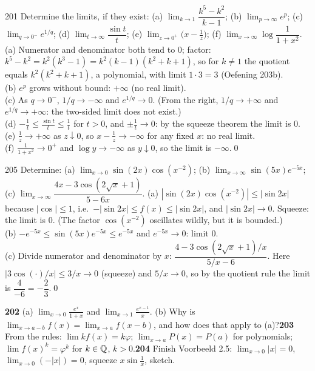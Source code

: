\begin{bookex}{201}
Determine the limits, if they exist: (a) $\lim_{k\to1}\dfrac{k^5-k^2}{k-1}$; (b) $\lim_{p\to\infty}e^p$; (c) $\lim_{q\to0^-}e^{1/q}$; (d) $\lim_{t\to\infty}\dfrac{\sin t}t$; (e) $\lim_{z\to0^+}\big(x-\frac1z\big)$; (f) $\lim_{x\to\infty}\log\dfrac1{1+x^2}$.
\solution
(a) Numerator and denominator both tend to $0$; factor: $k^5-k^2=k^2(k^3-1)=k^2(k-1)(k^2+k+1)$, so for $k\ne1$ the quotient equals $k^2(k^2+k+1)$, a polynomial, with limit $1\cdot3=3$ (Oefening 203b).\\
(b) $e^p$ grows without bound: $+\infty$ (no real limit).\\
(c) As $q\to0^-$, $1/q\to-\infty$ and $e^{1/q}\to0$. (From the right, $1/q\to+\infty$ and $e^{1/q}\to+\infty$: the two-sided limit does not exist.)\\
(d) $-\frac1t\le\frac{\sin t}t\le\frac1t$ for $t>0$, and $\pm\frac1t\to0$: by the squeeze theorem the limit is $0$.\\
(e) $\frac1z\to+\infty$ as $z\downarrow0$, so $x-\frac1z\to-\infty$ for any fixed $x$: no real limit.\\
(f) $\frac1{1+x^2}\to0^+$ and $\log y\to-\infty$ as $y\downarrow0$, so the limit is $-\infty$.\qed
\end{bookex}

\begin{bookex}{205}
Determine: (a) $\lim_{x\to0}\sin(2x)\cos(x^{-2})$; (b) $\lim_{x\to\infty}\sin(5x)e^{-5x}$; (c) $\lim_{x\to\infty}\dfrac{4x-3\cos(2\sqrt x+1)}{5-6x}$.
\solution
(a) $|\sin(2x)\cos(x^{-2})|\le|\sin2x|$ because $|\cos|\le1$, i.e.\ $-|\sin2x|\le f(x)\le|\sin2x|$, and $|\sin2x|\to0$. Squeeze: the limit is $0$. (The factor $\cos(x^{-2})$ oscillates wildly, but it is bounded.)\\
(b) $-e^{-5x}\le\sin(5x)e^{-5x}\le e^{-5x}$ and $e^{-5x}\to0$: limit $0$.\\
(c) Divide numerator and denominator by $x$: $\dfrac{4-3\cos(2\sqrt x+1)/x}{5/x-6}$. Here $|3\cos(\cdot)/x|\le3/x\to0$ (squeeze) and $5/x\to0$, so by the quotient rule the limit is $\dfrac4{-6}=-\dfrac23$.\qed
\end{bookex}

\begin{trybox}[{202, 203, 204}]
\textbf{202} (a) $\lim_{x\to0}\frac{e^x}{1+x}$ and $\lim_{x\to1}\frac{e^{x-1}}x$. (b) Why is $\lim_{x\to a-b}f(x)=\lim_{x\to a}f(x-b)$, and how does that apply to (a)?\quad \textbf{203} From the rules: $\lim kf(x)=k\varphi$; $\lim_{x\to a}P(x)=P(a)$ for polynomials; $\lim f(x)^k=\varphi^k$ for $k\in\mathbb{Q}$, $k>0$.\quad \textbf{204} Finish Voorbeeld 2.5: $\lim_{x\to0}|x|=0$, $\lim_{x\to0}(-|x|)=0$, squeeze $x\sin\frac1x$, sketch.
\end{trybox}

